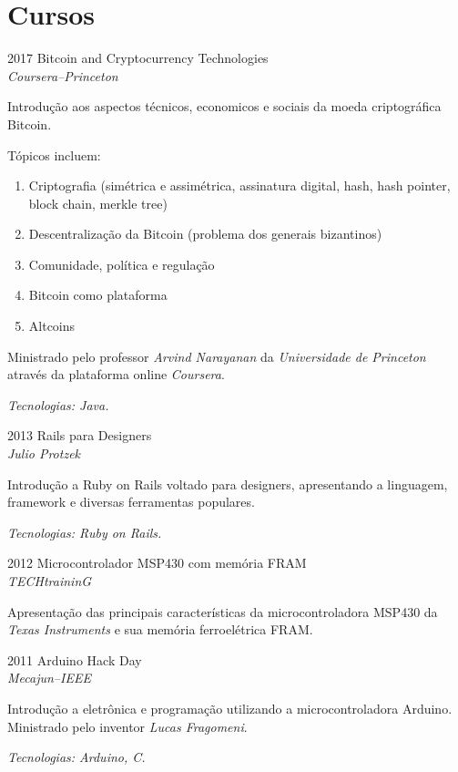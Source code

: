 \documentclass[a4paper]{simplecv}
\begin{document}
\section{Cursos}

\begin{topic}
\item[2017] Bitcoin and Cryptocurrency Technologies\\
	{\em\small Coursera--Princeton}

	Introdução aos aspectos técnicos, economicos e sociais da moeda
	criptográfica Bitcoin.

	Tópicos incluem:
	\begin{enumerate}
		\item Criptografia (simétrica e assimétrica, assinatura
			digital, hash, hash pointer, block chain, merkle tree)
		\item Descentralização da Bitcoin (problema dos generais
			bizantinos)
		\item Comunidade, política e regulação
		\item Bitcoin como plataforma
		\item Altcoins
	\end{enumerate}

	Ministrado pelo professor \emph{Arvind Narayanan} da
	\emph{Universidade de Princeton} através da plataforma online
	\emph{Coursera}.

	{\em\scriptsize Tecnologias: Java.}

\item[2013] Rails para Designers\\
	{\em\small Julio Protzek}

	Introdução a Ruby on Rails voltado para designers, apresentando
	a linguagem, framework e diversas ferramentas populares.

	{\em\scriptsize Tecnologias: Ruby on Rails.}

\item[2012] Microcontrolador MSP430 com memória FRAM\\
	{\em\small TECHtraininG}

	Apresentação das principais características da microcontroladora MSP430
	da \emph{Texas Instruments} e sua memória ferroelétrica FRAM.

\item[2011] Arduino Hack Day\\
	{\em\small Mecajun--IEEE}

	Introdução a eletrônica e programação utilizando a microcontroladora
	Arduino. Ministrado pelo inventor \emph{Lucas Fragomeni}.

	{\em\scriptsize Tecnologias: Arduino, C.}

\end{topic}
\end{document}
